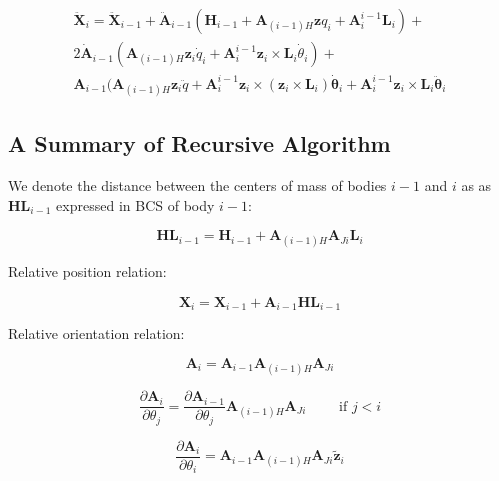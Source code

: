 \documentclass{article}
\begin{document}
\begin{eqnarray}
\ddot{\mathbf X}_i=\ddot{\mathbf X}_{i-1} + \mathbf{\ddot A}_{i-1}
(\mathbf{H}_{i-1}+\mathbf{A}_{(i-1)H}\mathbf{z}q_i+\mathbf{A}^{i-1}_i\mathbf{L}_i) +  \nonumber\\
2\mathbf{\dot A}_{i-1}
(\mathbf{A}_{(i-1)H}\mathbf{z}_i\dot{q}_i+\mathbf{A}^{i-1}_i{\mathbf z}_i{\times}\mathbf{L}_i\dot{\theta}_i) + \nonumber\\
\mathbf{A}_{i-1}
({\mathbf A}_{(i-1)H}\mathbf{z}_i\ddot{q}+{\mathbf A}^{i-1}_i\mathbf{z}_i{\times}(\mathbf{z}_i{\times}{\mathbf L}_i)\mathbf{\dot \theta}_i+{\mathbf A}^{i-1}_i\mathbf{z}_i{\times}{\mathbf L}_i\mathbf{\ddot \theta}_i
\end{eqnarray}

\subsection{A Summary of Recursive Algorithm}

We denote the distance between the centers of mass of bodies $i-1$ and $i$ as as $\mathbf{HL}_{i-1}$ expressed in BCS of body $i-1$:

\begin{displaymath}
\mathbf{HL}_{i-1} = \mathbf{H}_{i-1}+\mathbf{A}_{(i-1)H}\mathbf{A}_{Ji}\mathbf{L}_i
\end{displaymath}

Relative position relation:

\begin{equation}
\mathbf{X}_i = \mathbf{X}_{i-1}+\mathbf{A}_{i-1}\mathbf{HL}_{i-1}
\end{equation}

Relative orientation relation:

\begin{equation}
\mathbf{A}_i = \mathbf{A}_{i-1}\mathbf{A}_{(i-1)H}\mathbf{A}_{Ji}
\end{equation}

\begin{equation}
\frac{\partial \mathbf{A}_i}{\partial \theta_j} =	
\frac{\partial \mathbf{A}_{i-1}}{\partial \theta_j} \mathbf{A}_{(i-1)H}\mathbf{A}_{Ji}
	\qquad \textrm{  if  } j < i
\end{equation}

\begin{equation}
\frac{\partial \mathbf{A}_i}{\partial \theta_{i}} =	
\mathbf{A}_{i-1}\mathbf{A}_{(i-1)H}\mathbf{A}_{Ji}\tilde{\mathbf z}_i
\end{equation}
\end{document}

